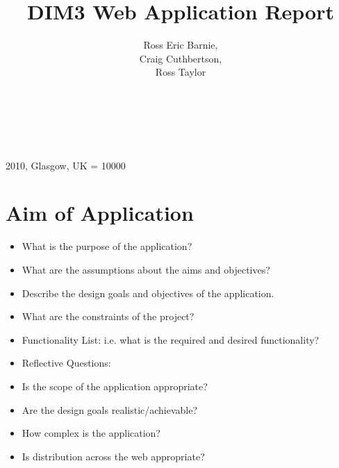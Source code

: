 \documentclass{sig-alt-release2}
\begin{document}
\newcommand{\todo}[1]{\textcolor{red}{#1}}
\def\newblock{\hskip .11em plus .33em minus .07em}

 {2010, Glasgow, UK} 
\widowpenalty = 10000

\title{DIM3 Web Application Report}

\author{
\alignauthor
Ross Eric Barnie, \\
Craig Cuthbertson, \\
Ross Taylor \\
\\
\\
\\
}
\maketitle

\begin{abstract}


\end{abstract}

\section{Aim of Application}
\begin{itemize}
\item	What is the purpose of the application?
\item	What are the assumptions about the aims and objectives?
\item	Describe the design goals and objectives of the application.
\item	What are the constraints of the project?
\item	Functionality List: i.e. what is the required and desired functionality?
\item	Reflective Questions: 
\item	Is the scope of the application appropriate? 
\item	Are the design goals realistic/achievable? 
\item	How complex is the application? 
\item	Is distribution across the web appropriate? 
\end{itemize}
\end{document}
